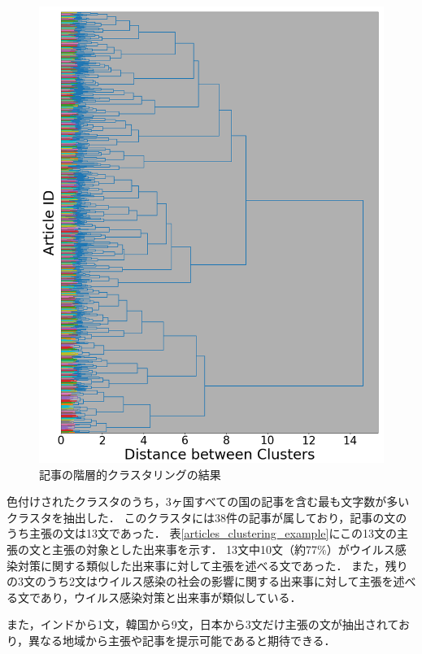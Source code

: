 \documentclass[12pt,a4j,dvipdfmx]{jreport}
\begin{document}
\begin{figure}[H]
	\centering
	\includegraphics[keepaspectratio, width=120mm]{img/process-06_articles-cluster_color_dendrogram_with-threshold-85_reduced-data-to-5000_Trim.png}
	\caption{記事の階層的クラスタリングの結果}
	\label{articles_dendrogram}
\end{figure}

\newpage

色付けされたクラスタのうち，3ヶ国すべての国の記事を含む最も文字数が多いクラスタを抽出した．
このクラスタには38件の記事が属しており，記事の文のうち主張の文は13文であった．
表\ref{articles_clustering_example}にこの13文の主張の文と主張の対象とした出来事を示す．
13文中10文（約77\%）がウイルス感染対策に関する類似した出来事に対して主張を述べる文であった．
また，残りの3文のうち2文はウイルス感染の社会の影響に関する出来事に対して主張を述べる文であり，ウイルス感染対策と出来事が類似している．

また，インドから1文，韓国から9文，日本から3文だけ主張の文が抽出されており，異なる地域から主張や記事を提示可能であると期待できる．
\end{document}
